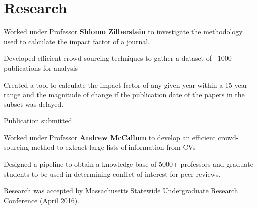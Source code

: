 \documentclass[letterpaper]{deedy-resume} %
\begin{document}
\begin{minipage}[t]{0.65\textwidth}
\sectionspace %




\section{Research}


\begin{tightitemize}
\item Worked under Professor \textbf{\href{http://rbr.cs.umass.edu/shlomo/}{Shlomo Zilberstein}} to investigate the methodology used to calculate the impact factor of a journal.
\item Developed efficient crowd-sourcing techniques to gather a dataset of ~1000 publications for analysis
\item Created a tool to calculate the impact factor of any given year within a 15 year range and the magnitude of change if the publication date of the papers in the subset was delayed.
\item Publication submitted
\end{tightitemize}
\sectionspace %



\begin{tightitemize}
\item Worked under Professor \textbf{\href{https://people.cs.umass.edu/~mccallum/}{Andrew McCallum}} to develop an efficient crowd-sourcing method to extract large lists of information from CVs
\item Designed a pipeline to obtain a knowledge base of 5000+ professors and graduate students to be used in determining conflict of interest for peer reviews.
\item Research was accepted by Massachusetts Statewide Undergraduate Research Conference (April 2016).
\end{tightitemize}


\end{minipage}
\end{document}
